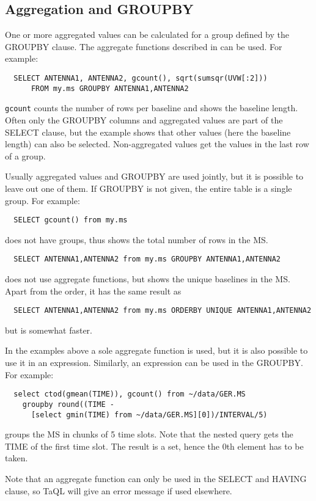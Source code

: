 \subsection{Aggregation and GROUPBY}
One or more aggregated values
can be calculated for a group defined by the GROUPBY clause.
The aggregate functions described in 
 can be used.
For example:
\begin{verbatim}
  SELECT ANTENNA1, ANTENNA2, gcount(), sqrt(sumsqr(UVW[:2]))
      FROM my.ms GROUPBY ANTENNA1,ANTENNA2
\end{verbatim}
\texttt{gcount} counts the number of rows per baseline and shows the
baseline length.
\\Often only the GROUPBY columns and aggregated values are part of the
SELECT clause, but the example shows that other values (here the
baseline length) can also be selected. Non-aggregated values get the
values in the last row of a group. 

Usually aggregated values and GROUPBY are used jointly, but it is
possible to leave out one of them. If GROUPBY is not given, the entire
table is a single group. For example: 
\begin{verbatim}
  SELECT gcount() from my.ms
\end{verbatim}
does not have groups, thus shows the total number of rows in the MS.
\begin{verbatim}
  SELECT ANTENNA1,ANTENNA2 from my.ms GROUPBY ANTENNA1,ANTENNA2
\end{verbatim}
does not use aggregate functions, but shows the unique baselines in
the MS. Apart from the order, it has the same result as
\begin{verbatim}
  SELECT ANTENNA1,ANTENNA2 from my.ms ORDERBY UNIQUE ANTENNA1,ANTENNA2
\end{verbatim}
but is somewhat faster.

In the examples above a sole aggregate function is used, but it is
also possible to use it in an expression. Similarly, an expression can
be used in the GROUPBY. For example:
\begin{verbatim}
  select ctod(gmean(TIME)), gcount() from ~/data/GER.MS
    groupby round((TIME -
      [select gmin(TIME) from ~/data/GER.MS][0])/INTERVAL/5)
\end{verbatim}
groups the MS in chunks of 5 time slots. Note that the nested query
gets the TIME of the first time slot. The result is a set, hence the 0th element
has to be taken.

Note that an aggregate function can only be used in the SELECT and
HAVING clause, so TaQL will give an error message if used elsewhere.

